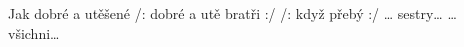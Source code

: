\begin{TEXT}{Jak dobré a utěšené}
\SLOKA /:  dobré a utě  bratři  :/ \NL
/:    když přebý :/ 
\SLOKA … sestry… 
\SLOKA … všichni… 
\end{TEXT}
